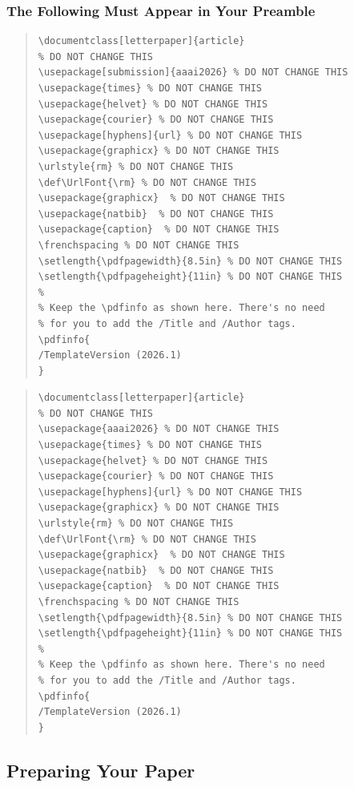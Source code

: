 \documentclass[letterpaper]{article} %
\def\UrlFont{\rm}  %
\begin{document}
\subsubsection{The Following Must Appear in Your Preamble}
\ifdefined\aaaianonymous
\begin{quote}
\begin{scriptsize}\begin{verbatim}
\documentclass[letterpaper]{article}
% DO NOT CHANGE THIS
\usepackage[submission]{aaai2026} % DO NOT CHANGE THIS
\usepackage{times} % DO NOT CHANGE THIS
\usepackage{helvet} % DO NOT CHANGE THIS
\usepackage{courier} % DO NOT CHANGE THIS
\usepackage[hyphens]{url} % DO NOT CHANGE THIS
\usepackage{graphicx} % DO NOT CHANGE THIS
\urlstyle{rm} % DO NOT CHANGE THIS
\def\UrlFont{\rm} % DO NOT CHANGE THIS
\usepackage{graphicx}  % DO NOT CHANGE THIS
\usepackage{natbib}  % DO NOT CHANGE THIS
\usepackage{caption}  % DO NOT CHANGE THIS
\frenchspacing % DO NOT CHANGE THIS
\setlength{\pdfpagewidth}{8.5in} % DO NOT CHANGE THIS
\setlength{\pdfpageheight}{11in} % DO NOT CHANGE THIS
%
% Keep the \pdfinfo as shown here. There's no need
% for you to add the /Title and /Author tags.
\pdfinfo{
/TemplateVersion (2026.1)
}
\end{verbatim}\end{scriptsize}
\end{quote}
\else
\begin{quote}
\begin{scriptsize}\begin{verbatim}
\documentclass[letterpaper]{article}
% DO NOT CHANGE THIS
\usepackage{aaai2026} % DO NOT CHANGE THIS
\usepackage{times} % DO NOT CHANGE THIS
\usepackage{helvet} % DO NOT CHANGE THIS
\usepackage{courier} % DO NOT CHANGE THIS
\usepackage[hyphens]{url} % DO NOT CHANGE THIS
\usepackage{graphicx} % DO NOT CHANGE THIS
\urlstyle{rm} % DO NOT CHANGE THIS
\def\UrlFont{\rm} % DO NOT CHANGE THIS
\usepackage{graphicx}  % DO NOT CHANGE THIS
\usepackage{natbib}  % DO NOT CHANGE THIS
\usepackage{caption}  % DO NOT CHANGE THIS
\frenchspacing % DO NOT CHANGE THIS
\setlength{\pdfpagewidth}{8.5in} % DO NOT CHANGE THIS
\setlength{\pdfpageheight}{11in} % DO NOT CHANGE THIS
%
% Keep the \pdfinfo as shown here. There's no need
% for you to add the /Title and /Author tags.
\pdfinfo{
/TemplateVersion (2026.1)
}
\end{verbatim}\end{scriptsize}
\end{quote}
\fi

\subsection{Preparing Your Paper}
\end{document}

